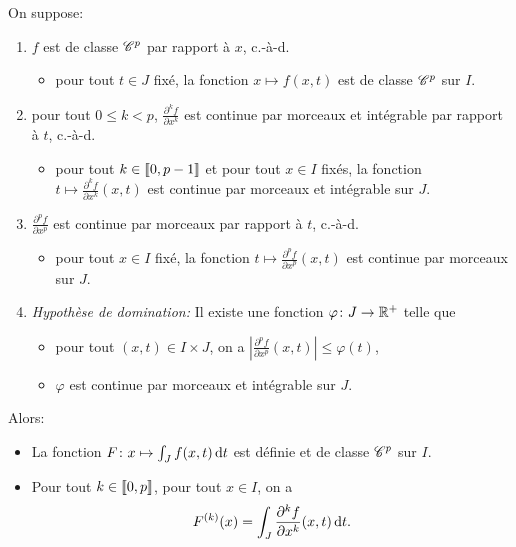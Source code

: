 \documentclass{yann}
\begin{document}
On suppose:
\begin{enumerate}
\item
$f$ est de classe $\mathscr{C}^{p}$ par rapport à $x$, c.-à-d.

  \begin{itemize}
  \item
pour tout $t\in J$ fixé, la fonction $x \mapsto f(x,t)$ est de classe $\mathscr{C}^{p}$ sur $I$.
  \end{itemize}
\item
pour tout $0\leq k<p$,
  $\frac{\partial^k f}{\partial x^k}$ est continue par morceaux
  et intégrable par rapport à $t$, c.-à-d.

  \begin{itemize}
  \item
pour tout $k\in\llbracket{0,p-1}\rrbracket$ et pour tout $x\in I$ fixés,
    la fonction $t \mapsto \frac{\partial^k f}{\partial x^k} (x,t)$
    est continue par morceaux et intégrable sur $J$.
  \end{itemize}
\item
$\frac{\partial^p f}{\partial x^p}$ est continue par morceaux par rapport à $t$, c.-à-d.

  \begin{itemize}
  \item
pour tout $x\in I$ fixé, la fonction $t \mapsto \frac{\partial^p f}{\partial x^p} (x,t)$
    est continue par morceaux sur $J$.
  \end{itemize}
\item
\emph{Hypothèse de domination:}
  Il existe une fonction $\varphi\colon J \to \mathbb{R}^+$ telle que

  \begin{itemize}
  \item
pour tout $(x,t)\in I\times J$, on a $\left| \frac{\partial^p f}{\partial x^p} (x,t) \right| \leq \varphi(t)$,
  \item
$\varphi$ est continue par morceaux et intégrable sur $J$.
  \end{itemize}
\end{enumerate}

Alors:
\begin{itemize}
\item
La fonction $F \colon x \mapsto \int_J f(x,t) \mathop{}\!\mathrm{d} t$ est définie et de classe $\mathscr{C}^{p}$ sur $I$.
\item
Pour tout $k\in\llbracket{0,p}\rrbracket$, pour tout $x\in I$,
  on a \[ F^{(k)}(x) = \int_J \frac{\partial^k f}{\partial x^k}(x,t) \mathop{}\!\mathrm{d} t. \]
\end{itemize}
\end{document}
